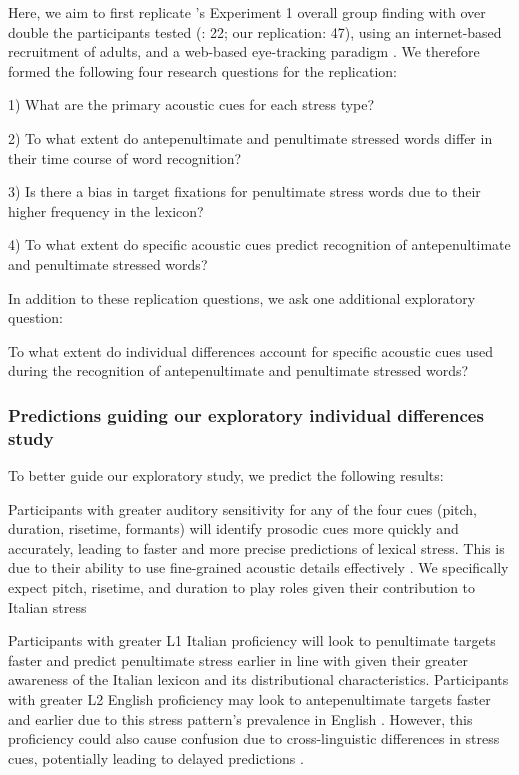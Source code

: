 {Here, we aim to first replicate \cite{Sulpizio_McQueen_2012}'s Experiment 1 overall group finding with over double the participants tested (\cite{Sulpizio_McQueen_2012}: 22; our replication: 47), using an internet-based recruitment of adults, and a web-based eye-tracking paradigm \citep{Vos_2017}. We therefore formed the following four research questions for the replication:

1) What are the primary acoustic cues for each stress type? 

2) To what extent do antepenultimate and penultimate stressed words differ in their time course of word recognition? 

3) Is there a bias in target fixations for penultimate stress words due to their higher frequency in the lexicon? 

4) To what extent do specific acoustic cues predict recognition of antepenultimate and penultimate stressed words? 

In addition to these replication questions, we ask one additional exploratory question: 

To what extent do individual differences account for specific acoustic cues used during the recognition of antepenultimate and penultimate stressed words?

\subsubsection{Predictions guiding our exploratory individual differences study}
To better guide our exploratory study, we predict the following results: 

Participants with greater auditory sensitivity for any of the four cues (pitch, duration, risetime, formants) will identify prosodic cues more quickly and accurately, leading to faster and more precise predictions of lexical stress. This is due to their ability to use fine-grained acoustic details effectively \citep{nan_2010, goss_2014,mcmurray_2008}. We specifically expect pitch, risetime, and duration to play roles given their contribution to Italian stress \citep{Tagliapietra2005, Alfano2006,Alfano2009,Maturi1998}

Participants with greater L1 Italian proficiency will look to penultimate targets faster and predict penultimate stress earlier in line with \cite{Sulpizio_McQueen_2012} given their greater awareness of the Italian lexicon and its distributional characteristics. Participants with greater L2 English proficiency may look to antepenultimate targets faster and earlier due to this stress pattern's prevalence in English \citep{cutler2007dutch}. However, this proficiency could also cause confusion due to cross-linguistic differences in stress cues, potentially leading to delayed predictions \citep{primativo2013bilingual}. 

}
